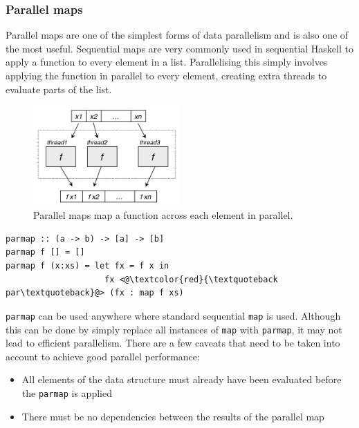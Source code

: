 \documentclass[CS4204-Notes.tex]{subfiles}
\begin{document}
\subsubsection{Parallel maps}
Parallel maps are one of the simplest forms of data parallelism and is also one of the most useful. Sequential maps are very commonly used in sequential Haskell to apply a function to every element in a list. Parallelising this simply involves applying the function in parallel to every element, creating extra threads to evaluate parts of the list. 
\begin{figure}[H]
\centering
\includegraphics[width=0.5\textwidth, keepaspectratio]{imgs/parallel-map.png}
\caption{Parallel maps map a function across each element in parallel.}
\end{figure}
\noindent

\begin{lstlisting}[caption={Parallel map implementation}]
parmap :: (a -> b) -> [a] -> [b]
parmap f [] = []
parmap f (x:xs) = let fx = f x in
					fx <@\textcolor{red}{\textquoteback par\textquoteback}@> (fx : map f xs)
\end{lstlisting}
\texttt{parmap} can be used anywhere where standard sequential \texttt{map} is used. Although this can be done by simply replace all instances of \texttt{map} with \texttt{parmap}, it may not lead to efficient parallelism. There are a few caveats that need to be taken into account to achieve good parallel performance:
\begin{itemize}
\item All elements of the data structure must already have been evaluated before the \texttt{parmap} is applied
\item There must be no dependencies between the results of the parallel map
\end{itemize}
\end{document}
